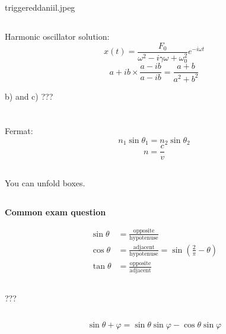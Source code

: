 \documentclass[12pt]{report}
\newcommand{\vphi}{\varphi}
\newcommand{\exam}{\begin{center}
\textbf{Common exam question}
\end{center}}
\begin{document}
\subsection{}
triggereddaniil.jpeg

\subsection{}
Harmonic oscillator solution:
\[x(t)=\frac{F_0}{\omega^2-i\gamma\omega+\omega_0^2}e^{-i\omega t}\]
\[a+ib\times\frac{a-ib}{a-ib}=\frac{a+b}{a^2+b^2}\]

b) and c) ???

\section{}

\subsection{}
Fermat:
\[n_1\sin\theta_1=n_2\sin\theta_2\]
\[n=\frac{c}{v}\]

\subsection{}
You can unfold boxes.

\subsection{}
\exam
\begin{align*}
\sin\theta&=\mathrm{\frac{opposite}{hypotenuse}}\\
\cos\theta&=\mathrm{\frac{adjacent}{hypotenuse}}=\sin\left(\frac{2}{\pi}-\theta\right)\\
\tan\theta&=\mathrm{\frac{opposite}{adjacent}}
\end{align*}

\subsection{}
???

\subsection{}
\[\sin\theta+\vphi=\sin\theta\sin\vphi-\cos\theta\sin\vphi\]

\section{}
\end{document}

